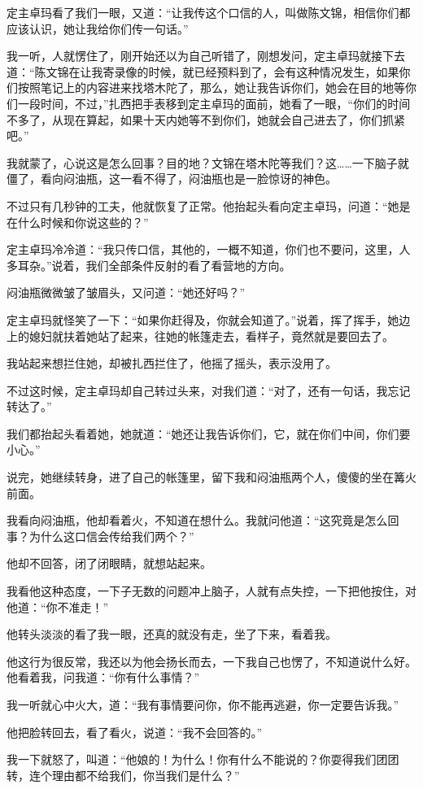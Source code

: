 定主卓玛看了我们一眼，又道：“让我传这个口信的人，叫做陈文锦，相信你们都应该认识，她让我给你们传一句话。”

我一听，人就愣住了，刚开始还以为自己听错了，刚想发问，定主卓玛就接下去道：“陈文锦在让我寄录像的时候，就已经预料到了，会有这种情况发生，如果你们按照笔记上的内容进来找塔木陀了，那么，她让我告诉你们，她会在目的地等你们一段时间，不过，”扎西把手表移到定主卓玛的面前，她看了一眼，“你们的时间不多了，从现在算起，如果十天内她等不到你们，她就会自己进去了，你们抓紧吧。”

我就蒙了，心说这是怎么回事？目的地？文锦在塔木陀等我们？这……一下脑子就僵了，看向闷油瓶，这一看不得了，闷油瓶也是一脸惊讶的神色。

不过只有几秒钟的工夫，他就恢复了正常。他抬起头看向定主卓玛，问道：“她是在什么时候和你说这些的？”

定主卓玛冷冷道：“我只传口信，其他的，一概不知道，你们也不要问，这里，人多耳杂。”说着，我们全部条件反射的看了看营地的方向。

闷油瓶微微皱了皱眉头，又问道：“她还好吗？”

定主卓玛就怪笑了一下：“如果你赶得及，你就会知道了。”说着，挥了挥手，她边上的媳妇就扶着她站了起来，往她的帐篷走去，看样子，竟然就是要回去了。

我站起来想拦住她，却被扎西拦住了，他摇了摇头，表示没用了。

不过这时候，定主卓玛却自己转过头来，对我们道：“对了，还有一句话，我忘记转达了。”

我们都抬起头看着她，她就道：“她还让我告诉你们，它，就在你们中间，你们要小心。”

说完，她继续转身，进了自己的帐篷里，留下我和闷油瓶两个人，傻傻的坐在篝火前面。

我看向闷油瓶，他却看着火，不知道在想什么。我就问他道：“这究竟是怎么回事？为什么这口信会传给我们两个？”

他却不回答，闭了闭眼睛，就想站起来。

我看他这种态度，一下子无数的问题冲上脑子，人就有点失控，一下把他按住，对他道：“你不准走！”

他转头淡淡的看了我一眼，还真的就没有走，坐了下来，看着我。

他这行为很反常，我还以为他会扬长而去，一下我自己也愣了，不知道说什么好。他看着我，问我道：“你有什么事情？”

我一听就心中火大，道：“我有事情要问你，你不能再逃避，你一定要告诉我。”

他把脸转回去，看了看火，说道：“我不会回答的。”

我一下就怒了，叫道：“他娘的！为什么！你有什么不能说的？你耍得我们团团转，连个理由都不给我们，你当我们是什么？”

